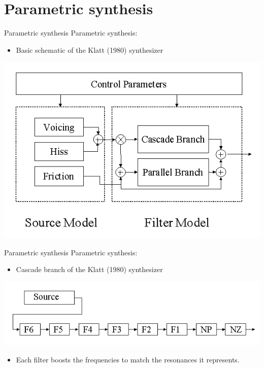 \documentclass{beamer}
\begin{document}
\section{Parametric synthesis}
\begin{frame}{Parametric synthesis}
Parametric synthesis:
\begin{itemize}
\item{Basic schematic of the Klatt (1980) synthesizer}
\end{itemize}
\includegraphics[scale=0.5,keepaspectratio]{klatt.png}
\end{frame}
\begin{frame}{Parametric synthesis}
Parametric synthesis:
\begin{itemize}
\item{Cascade branch of the Klatt (1980) synthesizer}
\end{itemize}
\includegraphics[scale=0.4,keepaspectratio]{cascade.png}
\begin{itemize}
\item{Each filter boosts the frequencies to match the resonances it represents.}
\end{itemize}
\end{frame}
\end{document}
